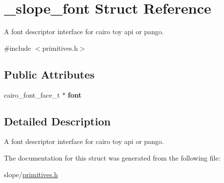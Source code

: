 \hypertarget{struct__slope__font}{\section{\+\_\+slope\+\_\+font Struct Reference}
\label{struct__slope__font}
}


A font descriptor interface for cairo toy api or pango.  




{\ttfamily \#include $<$primitives.\+h$>$}

\subsection*{Public Attributes}
\begin{DoxyCompactItemize}
\item 
\hypertarget{struct__slope__font_af3871e332bc43be457903856c865ca2b}{cairo\+\_\+font\+\_\+face\+\_\+t $\ast$ {\bfseries font}}\label{struct__slope__font_af3871e332bc43be457903856c865ca2b}

\end{DoxyCompactItemize}


\subsection{Detailed Description}
A font descriptor interface for cairo toy api or pango. 

The documentation for this struct was generated from the following file\+:\begin{DoxyCompactItemize}
\item 
slope/\hyperlink{primitives_8h}{primitives.\+h}\end{DoxyCompactItemize}
